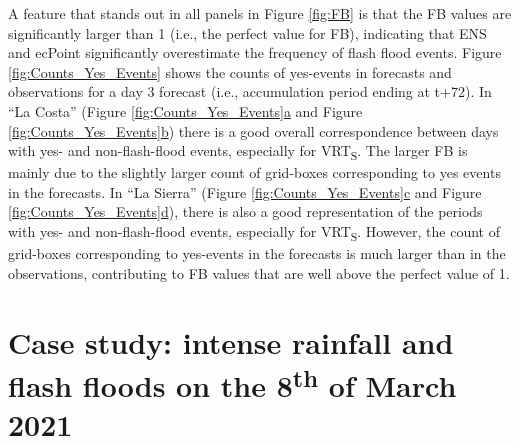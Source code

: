 \documentclass[techmemo]{ecmwfrep}%
\begin{document}
A feature that stands out in all panels in Figure \ref{fig:FB} is that the FB values are significantly larger than 1 (i.e., the perfect value for FB), indicating that ENS and ecPoint significantly overestimate the frequency of flash flood events. Figure \ref{fig:Counts_Yes_Events} shows the counts of yes-events in forecasts and observations for a day 3 forecast (i.e., accumulation period ending at t+72). In “La Costa” (Figure \ref{fig:Counts_Yes_Events}\hyperref[fig:Counts_Yes_Events]{a} and Figure \ref{fig:Counts_Yes_Events}\hyperref[fig:Counts_Yes_Events]{b}) there is a good overall correspondence between days with yes- and non-flash-flood events, especially for VRT\textsubscript{S}. The larger FB is mainly due to the slightly larger count of grid-boxes corresponding to yes events in the forecasts. In “La Sierra” (Figure \ref{fig:Counts_Yes_Events}\hyperref[fig:Counts_Yes_Events]{c} and Figure \ref{fig:Counts_Yes_Events}\hyperref[fig:Counts_Yes_Events]{d}), there is also a good representation of the periods with yes- and non-flash-flood events, especially for VRT\textsubscript{S}. However, the count of grid-boxes corresponding to yes-events in the forecasts is much larger than in the observations, contributing to FB values that are well above the perfect value of 1.   


\section{Case study: intense rainfall and flash floods on the 8\textsuperscript{th} of March 2021}
\label{sec:Case_Study}
\end{document}
